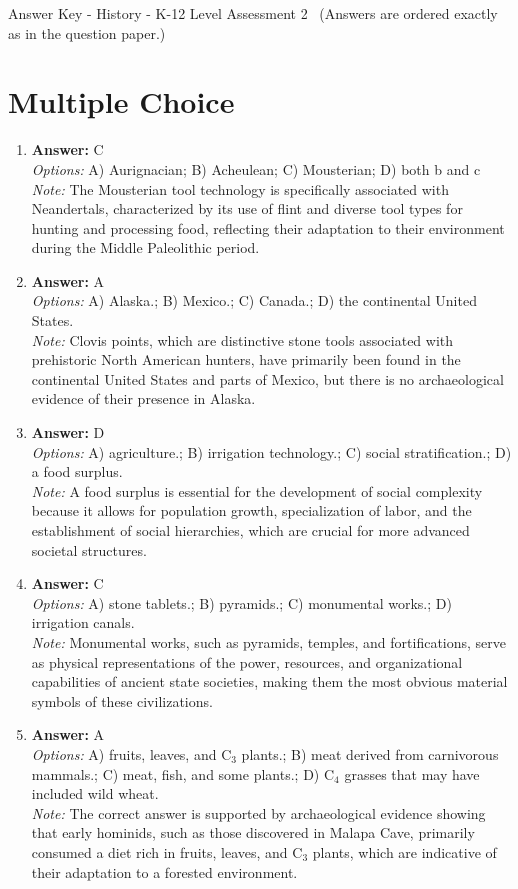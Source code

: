 \documentclass[12pt]{article}
\begin{document}
\begin{center}
Answer Key - History - K-12 Level Assessment 2 \
\small (Answers are ordered exactly as in the question paper.)
\end{center}

\section*{Multiple Choice}
\begin{enumerate}[label=\arabic*.]
\item \textbf{Answer:} C
\\ \textit{Options:} A) Aurignacian; B) Acheulean; C) Mousterian; D) both b and c
\\ \textit{Note:} The Mousterian tool technology is specifically associated with Neandertals, characterized by its use of flint and diverse tool types for hunting and processing food, reflecting their adaptation to their environment during the Middle Paleolithic period.
\item \textbf{Answer:} A
\\ \textit{Options:} A) Alaska.; B) Mexico.; C) Canada.; D) the continental United States.
\\ \textit{Note:} Clovis points, which are distinctive stone tools associated with prehistoric North American hunters, have primarily been found in the continental United States and parts of Mexico, but there is no archaeological evidence of their presence in Alaska.
\item \textbf{Answer:} D
\\ \textit{Options:} A) agriculture.; B) irrigation technology.; C) social stratification.; D) a food surplus.
\\ \textit{Note:} A food surplus is essential for the development of social complexity because it allows for population growth, specialization of labor, and the establishment of social hierarchies, which are crucial for more advanced societal structures.
\item \textbf{Answer:} C
\\ \textit{Options:} A) stone tablets.; B) pyramids.; C) monumental works.; D) irrigation canals.
\\ \textit{Note:} Monumental works, such as pyramids, temples, and fortifications, serve as physical representations of the power, resources, and organizational capabilities of ancient state societies, making them the most obvious material symbols of these civilizations.
\item \textbf{Answer:} A
\\ \textit{Options:} A) fruits, leaves, and C$_{3}$ plants.; B) meat derived from carnivorous mammals.; C) meat, fish, and some plants.; D) C$_{4}$ grasses that may have included wild wheat.
\\ \textit{Note:} The correct answer is supported by archaeological evidence showing that early hominids, such as those discovered in Malapa Cave, primarily consumed a diet rich in fruits, leaves, and C$_{3}$ plants, which are indicative of their adaptation to a forested environment.
\end{enumerate}
\end{document}
